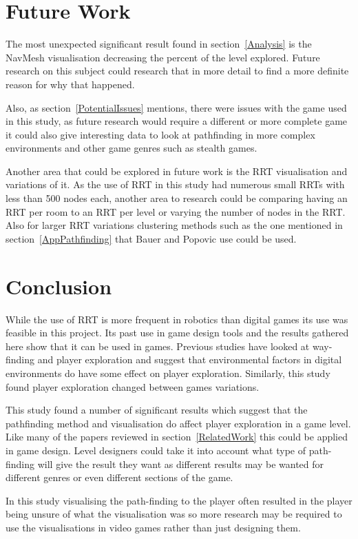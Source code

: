 \documentclass[journal]{IEEEtran}
\begin{document}
	
	\section{Future Work} \label{FutureWork}
	The most unexpected significant result found in section~\ref{Analysis} is the NavMesh visualisation decreasing the percent of the level explored. Future research on this subject could research that in more detail to find a more definite reason for why that happened. 
	
	Also, as section~\ref{PotentialIssues} mentions, there were issues with the game used in this study, as future research would require a different or more complete game it could also give interesting data to look at pathfinding in more complex environments and other game genres such as stealth games. 
	
	Another area that could be explored in future work is the RRT visualisation and variations of it. As the use of RRT in this study had numerous small RRTs with less than 500 nodes each, another area to research could be comparing having an RRT per room to an RRT per level or varying the number of nodes in the RRT. Also for larger RRT variations clustering methods such as the one mentioned in section~\ref{AppPathfinding} that Bauer and Popovic use could be used.
	
	
	\section{Conclusion} 
	While the use of RRT is more frequent in robotics than digital games its use was feasible in this project. Its past use in game design tools and the results gathered here show that it can be used in games. Previous studies have looked at way-finding and player exploration and suggest that environmental factors in digital environments do have some effect on player exploration.  Similarly, this study found player exploration changed between games variations. 
	
	This study found a number of significant results which suggest that the pathfinding method and visualisation do affect player exploration in a game level.  
	Like many of the papers reviewed in section~\ref{RelatedWork} this could be applied in game design. Level designers could take it into account what type of path-finding will give the result they want as different results may be wanted for different genres or even different sections of the game. 
	
	In this study visualising the path-finding to the player often resulted in the player being unsure of what the visualisation was so more research may be required to use the visualisations in video games rather than just designing them.
	
\end{document}
